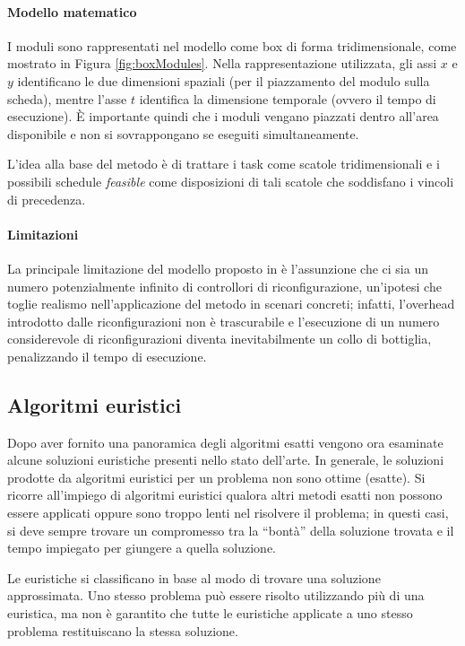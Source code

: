 
\paragraph{Modello matematico}
I moduli sono rappresentati nel modello come box di forma tridimensionale, come 
mostrato in Figura \ref{fig:boxModules}. Nella rappresentazione utilizzata, gli 
assi $x$ e $y$ identificano le due dimensioni spaziali (per il piazzamento del 
modulo sulla scheda), mentre l'asse $t$ identifica la dimensione temporale 
(ovvero il tempo di esecuzione). È importante quindi che i moduli vengano 
piazzati dentro all'area disponibile e non si sovrappongano se eseguiti 
simultaneamente.

L'idea alla base del metodo è di trattare i task come scatole tridimensionali e 
i possibili schedule \emph{feasible} come disposizioni di tali scatole che 
soddisfano i vincoli di precedenza.

\paragraph{Limitazioni}
La principale limitazione del modello proposto in \cite{FeketeOptimal} è 
l'assunzione che ci sia un numero potenzialmente infinito di controllori di 
riconfigurazione, un'ipotesi che toglie realismo nell'applicazione del metodo 
in scenari concreti; infatti, l'overhead introdotto dalle riconfigurazioni non 
è trascurabile e l'esecuzione di un numero considerevole di riconfigurazioni 
diventa inevitabilmente un collo di bottiglia, penalizzando il tempo di 
esecuzione.


\subsection{Algoritmi euristici}
\label{sec:algoritmiEuristici}
Dopo aver fornito una panoramica degli algoritmi esatti vengono ora esaminate 
alcune soluzioni euristiche presenti nello stato dell'arte. In generale, le 
soluzioni prodotte da algoritmi euristici per un problema non sono ottime 
(esatte). Si ricorre all'impiego di algoritmi euristici qualora altri metodi 
esatti non possono essere applicati oppure sono troppo lenti nel risolvere il 
problema; in questi casi, si deve sempre trovare un compromesso tra la 
``bontà'' della soluzione trovata e il tempo impiegato per giungere a quella 
soluzione.

Le euristiche si classificano in base al modo di trovare una soluzione 
approssimata.
Uno stesso problema può essere risolto utilizzando più di una 
euristica, ma non è garantito che tutte le euristiche applicate a uno stesso 
problema restituiscano la stessa soluzione.


